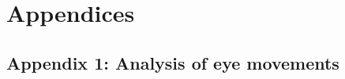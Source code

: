 \documentclass[12pt,english]{article}%
\begin{document}


\section{Appendices}
\subsection{Appendix 1: Analysis of eye movements}
\label{app:em}
\end{document}
